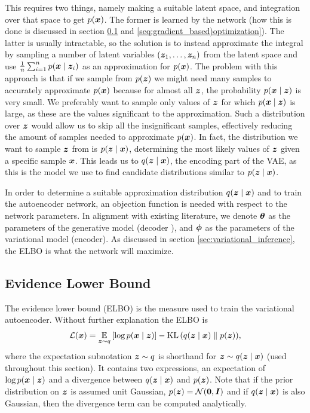 This requires two things, namely making a suitable latent space, and integration over that space to get $p(\bm{ x })$. The former is learned by the network (how this is done is discussed in section \ref{sec:elbo} and \ref{seq:gradient_based)optimization}). The latter is usually intractable, so the solution is to instead approximate the integral by sampling a number of latent variables $(\bm{ z }_1, \ldots, \bm{ z }_n)$ from the latent space and use $\frac{1}{n}\sum_{i = 1}^n p(\bm{ x } \mid \bm{ z }_i)$ as an approximation for $p(\bm{ x })$. The problem with this approach is that if we sample from $p(\bm{ z })$ we might need many samples to accurately approximate $p(\bm{ x })$ because for almost all $\bm{ z }$, the probability $p(\bm{ x } \mid \bm{ z })$ is very small. We preferably want to sample only values of $\bm{ z }$ for which $p(\bm{ x } \mid \bm{ z })$ is large, as these are the values significant to the approximation. Such a distribution over $\bm{ z }$ would allow us to skip all the insignificant samples, effectively reducing the amount of samples needed to approximate $p(\bm{ x })$. In fact, the distribution we want to sample $\bm{ z }$ from is $p(\bm{ z } \mid \bm{ x })$, determining the most likely values of $\bm{ z }$ given a specific sample $\bm{ x }$. This leads us to $q(\bm{ z } \mid \bm{ x })$, the encoding part of the VAE, as this is the model we use to find candidate distributions similar to $p(\bm{ z } \mid \bm{ x })$.

In order to determine a suitable approximation distribution $q(\bm{ z } \mid \bm{ x })$ and to train the autoencoder network, an objection function is needed with respect to the network parameters. In alignment with existing literature, we denote $\bm{ \theta }$ as the parameters of the generative model (decoder ), and $\bm{ \phi }$ as the parameters of the variational model (encoder). As discussed in section \ref{sec:variational_inference}, the ELBO is what the network will maximize.

\subsection{Evidence Lower Bound}
\label{sec:elbo}
The evidence lower bound (ELBO) is the measure used to train the variational autoencoder. Without further explanation the ELBO is
\begin{equation}
    \mathcal{L}(\bm{ x }) = \operatorname*{\mathbb{E}}_{\bm{ z }\sim q}{\mathopen{} \left[ \log p(\bm{ x } \mid \bm{ z }) \right] \mathclose{}} - \operatorname{KL}{\mathopen{} \left(q(\bm{ z } \mid \bm{ x }) \parallel p(\bm{ z })\right) \mathclose{}}\label{eq:elbo},
\end{equation}
where the expectation subnotation $\bm{ z } \sim q$ is shorthand for $\bm{ z } \sim q(\bm{ z } \mid \bm{ x })$ (used throughout this section). It contains two expressions, an expectation of $\log p(\bm{ x } \mid \bm{ z })$ and a divergence between $q(\bm{ z } \mid \bm{ x })$ and $p(\bm{ z })$. Note that if the prior distribution on $\bm{ z }$ is assumed unit Gaussian, $p(\bm{ z }) = \mathcal{N}(\bm{ 0 }, \bm{ I })$ and if $q(\bm{ z } \mid \bm{ x })$ is also Gaussian, then the divergence term can be computed analytically.

